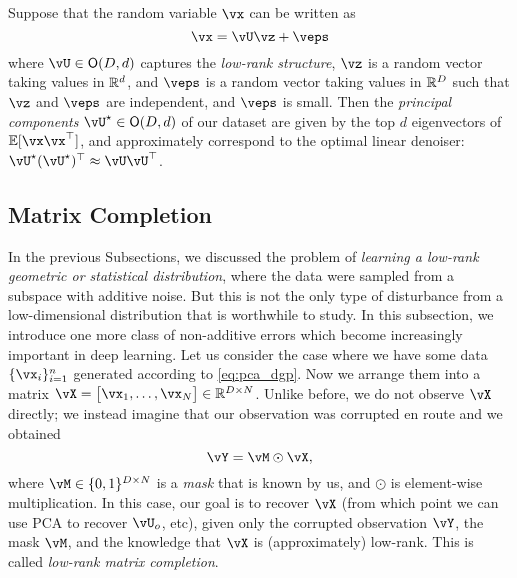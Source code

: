 \documentclass[\toplevelprefix/book-main.tex]{subfiles}
\begin{document}
\begin{theorem}\label{thm:ppca}
    Suppose that the random variable \(\vx\) can be written as
    \begin{equation}
        \vx = \vU\vz + \veps
    \end{equation}
    where \(\vU \in \O(D, d)\) captures the \textit{low-rank structure}, \(\vz\)
    is a random vector taking values in \(\mathbb{R}^{d}\), and \(\veps\) is a random
    vector taking values in \(\mathbb{R}^{D}\) such that \(\vz\) and \(\veps\) are
    independent, and \(\veps\) is small. Then the \textit{principal components}
    \(\vU^{\star} \in \O(D, d)\) of our dataset are given by the top \(d\)
    eigenvectors of \(\Ex[\vx\vx^{\top}]\), and approximately correspond to the
    optimal linear denoiser: \(\vU^{\star}(\vU^{\star})^{\top} \approx \vU\vU^{\top}\).
\end{theorem}



\subsection{Matrix Completion}

In the previous Subsections, we discussed the problem of \textit{learning a low-rank geometric or statistical distribution}, where the data were sampled from a subspace with additive noise. But this is not the only type of disturbance from a low-dimensional distribution that is worthwhile to study. In this subsection, we introduce one more class of non-additive errors which become increasingly important in deep learning. Let us consider the case where we have some data \(\{\vx_{i}\}_{i = 1}^{n}\) generated according to \eqref{eq:pca_dgp}. Now we arrange them into a matrix \(\vX = \mat{\vx_{1}, \dots, \vx_{N}} \in \R^{D \times N}\). Unlike before, we do not observe \(\vX\) directly; we instead imagine that our observation was corrupted en route and we obtained 
\begin{equation}
    \vY = \vM \odot \vX,
\end{equation}
where \(\vM \in \{0, 1\}^{D \times N}\) is a \textit{mask} that is known by us, and \(\odot\) is element-wise multiplication. In this case, our goal is to recover \(\vX\) (from which point we can use PCA to recover \(\vU_{o}\), etc), given only the corrupted observation \(\vY\), the mask \(\vM\), and the knowledge that \(\vX\) is (approximately) low-rank. This is called \textit{low-rank matrix completion}.
\end{document}
